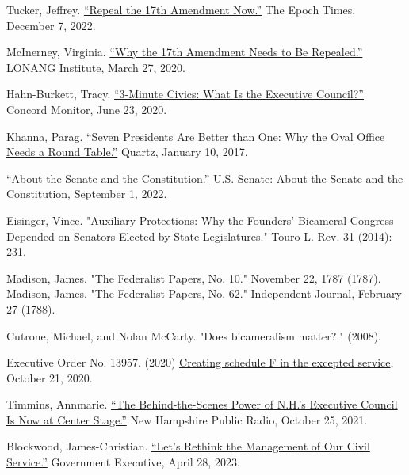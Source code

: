 \documentclass{article}
\begin{document}
\begin{thebibliography}{20}
Tucker, Jeffrey. \href{https://www.theepochtimes.com/repeal-the-17th-amendment-now\_4909126.html}{“Repeal the 17th Amendment Now.”} The Epoch Times, December 7, 2022.

McInerney, Virginia. \href{https://lonang.com/commentaries/conlaw/federalism/repeal-seventeenth-amendment/}{“Why the 17th Amendment Needs to Be Repealed.”} LONANG Institute, March 27, 2020.

Hahn-Burkett, Tracy. \href{https://www.concordmonitor.com/What-is-the-Executive-Council-34817477}{“3-Minute Civics: What Is the Executive Council?”} Concord Monitor, June 23, 2020.

Khanna, Parag. \href{https://qz.com/876260/seven-presidents-are-better-than-one-why-the-oval-office-needs-a-round-table}{“Seven Presidents Are Better than One: Why the Oval Office Needs a Round Table.”} Quartz, January 10, 2017.

\href{https://www.senate.gov/about/origins-foundations/senate-and-constitution.htm}{“About the Senate and the Constitution.”} U.S. Senate: About the Senate and the Constitution, September 1, 2022.

Eisinger, Vince. "Auxiliary Protections: Why the Founders' Bicameral Congress Depended on Senators Elected by State Legislatures." Touro L. Rev. 31 (2014): 231.

Madison, James. "The Federalist Papers, No. 10." November 22, 1787 (1787).
Madison, James. "The Federalist Papers, No. 62." Independent Journal, February 27 (1788).

Cutrone, Michael, and Nolan McCarty. "Does bicameralism matter?." (2008).

Executive Order No. 13957. (2020) \href{https://www.
federalregister.gov/documents/2020/10/26/2020-23780/creating-schedule-f-in-the-excepted-service}{Creating schedule F in the excepted service}, October 21, 2020.

Timmins, Annmarie. \href{https://www.nhpr.org/nh-news/2021-10-25/executive-council}{“The Behind-the-Scenes Power of N.H.’s Executive Council Is Now at Center Stage.”} New Hampshire Public Radio, October 25, 2021. 

Blockwood, James-Christian. \href{https://www.govexec.com/management/2023/04/lets-rethink-management-our-civil-service/385654/}{“Let’s Rethink the Management of Our Civil Service.”} Government Executive, April 28, 2023.


\end{thebibliography}
\end{document}
